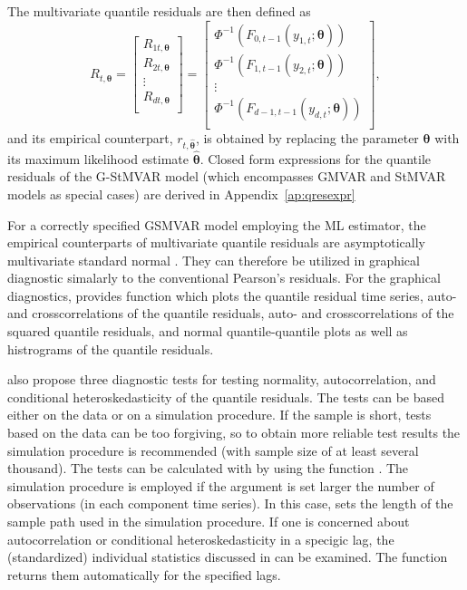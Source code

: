 \documentclass[nojss]{jss} %
\begin{document}
The multivariate quantile residuals are then defined as
\begin{equation}\label{eq:qrdef}
R_{t,\boldsymbol{\theta}}=
\begin{bmatrix}
  R_{1t,\boldsymbol{\theta}} \\
  R_{2t,\boldsymbol{\theta}} \\
  \vdots \\
  R_{dt,\boldsymbol{\theta}} \\
\end{bmatrix} =
\begin{bmatrix}
  \Phi^{-1}(F_{0,t-1}(y_{1,t};\boldsymbol{\theta})) \\
  \Phi^{-1}(F_{1,t-1}(y_{2,t};\boldsymbol{\theta}))\\
  \vdots \\
  \Phi^{-1}(F_{d-1,t-1}(y_{d,t};\boldsymbol{\theta})) \\
\end{bmatrix},
\end{equation}
and its empirical counterpart, $r_{t,\hat{\boldsymbol{\theta}}}$,  is obtained by replacing the parameter $\boldsymbol{\theta}$ with its maximum likelihood estimate $\hat{\boldsymbol{\theta}}$. Closed form expressions for the quantile residuals of the G-StMVAR model (which encompasses GMVAR and StMVAR models as special cases) are derived in Appendix~\ref{ap:qresexpr}

For a correctly specified GSMVAR model employing the ML estimator, the empirical counterparts of multivariate quantile residuals are asymptotically multivariate standard normal \citep[Lemma 3]{Kalliovirta+Saikkonen:2010}. They can therefore be utilized in graphical diagnostic simalarly to the conventional Pearson's residuals. For the graphical diagnostics,  provides function  which plots the quantile residual time series, auto- and crosscorrelations of the quantile residuals, auto- and crosscorrelations of the squared quantile residuals, and normal quantile-quantile plots as well as histrograms of the quantile residuals.

\cite{Kalliovirta+Saikkonen:2010} also propose three diagnostic tests for testing normality, autocorrelation, and conditional heteroskedasticity of the quantile residuals. The tests can be based either on the data or on a simulation procedure. If the sample is short, tests based on the data can be too forgiving, so to obtain more reliable test results the simulation procedure is recommended (with sample size of at least several thousand). The tests can be calculated with  by using the function . The simulation procedure is employed if the argument  is set larger the number of observations (in each component time series). In this case,  sets the length of the sample path used in the simulation procedure. If one is concerned about autocorrelation or conditional heteroskedasticity in a specigic lag, the (standardized) individual statistics discussed in \cite{Kalliovirta+Saikkonen:2010} can be examined. The function  returns them automatically for the specified lags.
\end{document}

